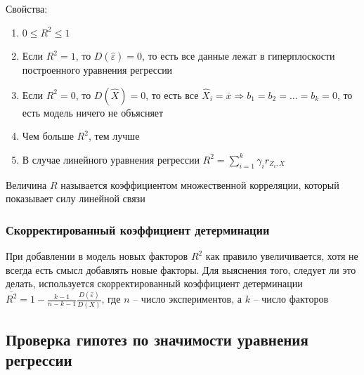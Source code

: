 Свойства:

\begin{enumerate}
    \item $0 \leq R^2 \leq 1$
    \item Если $R^2 = 1$, то $D(\hat \varepsilon) = 0$, то есть все данные лежат в гиперплоскости построенного уравнения регрессии
    \item Если $R^2 = 0$, то $D(\hat X) = 0$, то есть все $\hat X_i = \overline{x} \Longrightarrow b_1 = b_2 = \dots = b_k = 0$, то есть модель ничего не объясняет
    \item Чем больше $R^2$, тем лучше
    \item В случае линейного уравнения регрессии $R^2 = \sum_{i = 1}^k \gamma_i r_{Z_i, X}$
\end{enumerate}

\Def Величина $R$ называется коэффициентом множественной корреляции, который показывает силу линейной связи

\subsubsection{Скорректированный коэффициент детерминации}

При добавлении в модель новых факторов $R^2$ как правило увеличивается, хотя не всегда есть смысл добавлять новые факторы. 
Для выяснения того, следует ли это делать, используется скорректированный коэффициент детерминации $\overline{R^2} = 1 - \frac{k - 1}{n - k - 1} \frac{D(\hat \varepsilon)}{D(X)}$, 
где $n$ -- число экспериментов, а $k$ -- число факторов

\subsection{Проверка гипотез по значимости уравнения регрессии}

